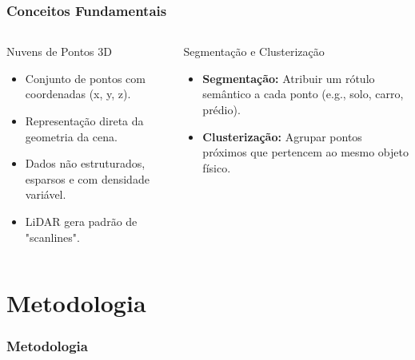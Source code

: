 \documentclass[aspectratio=169,t,xcolor=table]{beamer}
\begin{document}
\begin{frame}
    \frametitle{Conceitos Fundamentais}
    \begin{columns}[T]
       \begin{column}{.5\textwidth}
            \begin{block}{Nuvens de Pontos 3D}
                \begin{itemize}
                    \item<+-> Conjunto de pontos com coordenadas (x, y, z).
                    \item<+-> Representação direta da geometria da cena.
                    \item<+-> Dados não estruturados, esparsos e com densidade variável.
                    \item<+-> LiDAR gera padrão de "scanlines".
                \end{itemize}
            \end{block}
        \end{column}
        \begin{column}{.5\textwidth}
            \begin{block}{Segmentação e Clusterização}
                \begin{itemize}
                    \item<+-> \textbf{Segmentação:} Atribuir um rótulo semântico a cada ponto (e.g., solo, carro, prédio).
                    \item<+-> \textbf{Clusterização:} Agrupar pontos próximos que pertencem ao mesmo objeto físico.
                \end{itemize}
            \end{block}
        \end{column}
    \end{columns}
\end{frame}


\section{Metodologia}

\begin{frame}
    \frametitle{Metodologia}
\end{frame}
\end{document}
